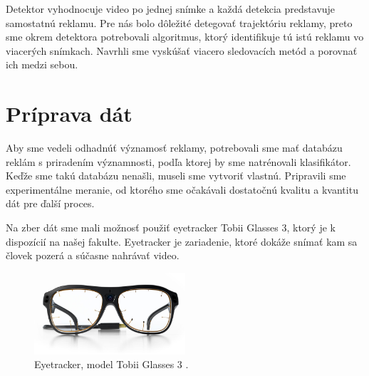 
Detektor vyhodnocuje video po jednej snímke a každá detekcia predstavuje samostatnú reklamu. Pre nás bolo dôležité detegovať trajektóriu reklamy, preto sme okrem detektora potrebovali algoritmus, ktorý identifikuje tú istú reklamu vo viacerých snímkach. Navrhli sme vyskúšať viacero sledovacích metód a porovnať ich medzi sebou.

\section{Príprava dát}

Aby sme vedeli odhadnúť významosť reklamy, potrebovali sme mať databázu reklám s priradením významnosti, podľa ktorej by sme natrénovali klasifikátor. Keďže sme takú databázu nenašli, museli sme vytvoriť vlastnú. Pripravili sme experimentálne meranie, od ktorého sme očakávali dostatočnú kvalitu a kvantitu dát pre ďalší proces.

Na zber dát sme mali možnosť použiť eyetracker Tobii Glasses 3, ktorý je k dispozícií na našej fakulte. Eyetracker je zariadenie, ktoré dokáže snímať kam sa človek pozerá a súčasne nahrávať video. 


\begin{figure}[ht]
    \centering
    \includegraphics[width=0.5\textwidth]{images/02/glasses.jpg}
    \caption{Eyetracker, model Tobii Glasses 3 \cite{tobii}.}
    \label{img:tobii}
\end{figure}

